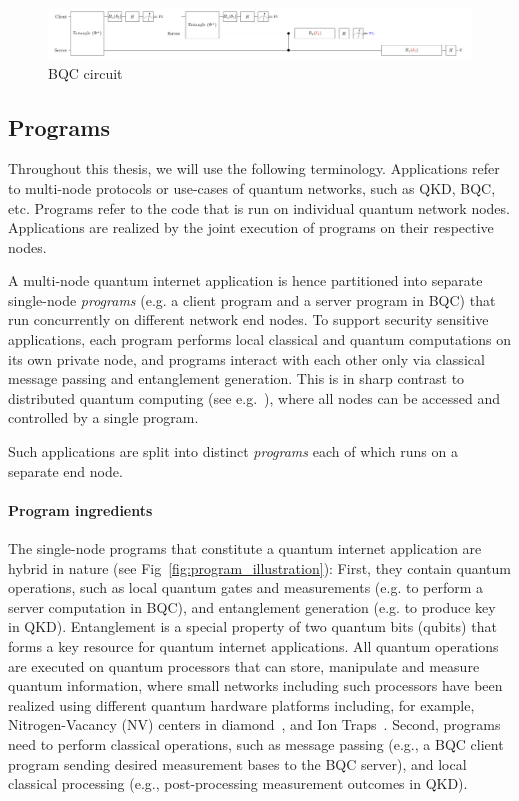 \begin{figure}[t]
    \centering
    \includegraphics[width=0.8\linewidth]{figures/background/bqc_circuit.pdf}
    \caption{
      BQC circuit 
    }
    \label{fig:example_circuit}
\end{figure}

\subsection{Programs}
Throughout this thesis, we will use the following terminology.
Applications refer to multi-node protocols or use-cases of quantum networks, such as QKD, BQC, etc.
Programs refer to the code that is run on individual quantum network nodes.
Applications are realized by the joint execution of programs on their respective nodes.

A multi-node quantum internet application is hence partitioned into separate single-node \textit{programs} (e.g. a client program and a server program in BQC) that run concurrently on different network end nodes.
To support security sensitive applications, each program performs local classical and quantum computations on its own private node, and programs interact with each other only via classical message passing and entanglement generation.
This is in sharp contrast to distributed quantum computing (see e.g.~\cite{cacciapuoti2019quantum}), where all nodes can be accessed and controlled by a single program. 


Such applications are split into distinct \textit{programs} each of which runs on a separate end node.


\paragraph{Program ingredients}

The single-node programs that constitute a quantum internet application are hybrid in nature (see Fig~\ref{fig:program_illustration}):
First, they contain quantum operations, such as local quantum gates and measurements (e.g. to perform a server computation in BQC), and entanglement generation (e.g. to produce key in QKD). Entanglement is a special property of two quantum bits (qubits) that forms a key resource for quantum internet applications. 
All quantum operations are executed on quantum processors that can store, manipulate and measure quantum information, where small networks including such processors have been realized using different quantum hardware platforms including, for example,  Nitrogen-Vacancy (NV) centers in diamond~\cite{pompili2021realization}, and Ion Traps~\cite{krutyanskiy2023entanglement}.
Second, programs need to perform classical operations, such as message passing (e.g., a BQC client program sending desired measurement bases to the BQC server), and local classical processing (e.g., post-processing measurement outcomes in QKD).


